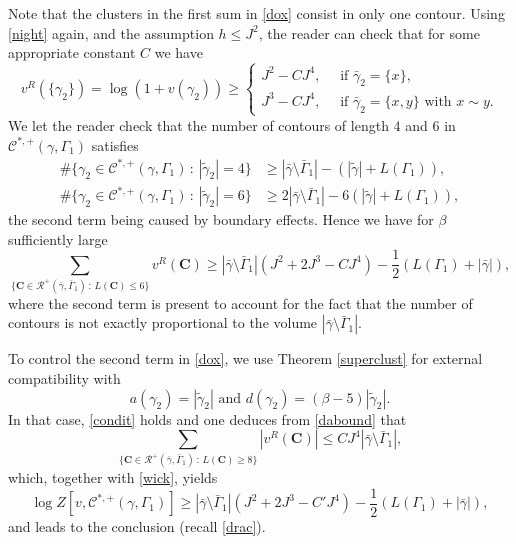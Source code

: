 \documentclass[JEP,XML,SOM,Unicode, NoFloatCountersInSection]{cedram}
\let\mathcal\mathscr
\newcommand{\sep}{\,:\,}
\numberwithin{equation}{section}
\theoremstyle{plain}
\theoremstyle{definition}
\newcommand{\cC}{{\ensuremath{\mathcal C}} }
\newcommand{\cR}{{\ensuremath{\mathcal R}} }
\newcommand{\bC}{{\ensuremath{\mathbf C}} }
\newcommand{\gb}{\beta}
\newcommand{\gG}{\Gamma}
\begin{document}
Note that the clusters in the first sum in \eqref{dox} consist in only one contour. Using \eqref{night} again, and the assumption $h\le J^2$, the reader can check that for some appropriate constant $C$ we have
\begin{equation}\label{speel}
v^R(\{\gamma_2\})=\log\left(1+ v(\gamma_2)\right)\ge \begin{cases} J^2-C J^4, \quad \text{ if } \bar \gamma_2=\{x\},\\
J^3-C J^4, \quad \text{ if } \bar \gamma_2=\{x,y\} \text{ with } x\sim y.
\end{cases}
\end{equation}
We let the reader check that the number of contours of length $4$ and $6$ in $\cC^{*,+}(\gamma,\gG_1)$ satisfies
\begin{equation*}
\begin{split}
\#\{ \gamma_2\in \cC^{*,+}(\gamma,\gG_1) \sep |\tilde \gamma_2|=4\}&\ge |\bar \gamma\setminus\bar \gG_1|-(|\tilde \gamma|+L(\gG_1)),\\
\#\{ \gamma_2\in \cC^{*,+}(\gamma,\gG_1) \sep |\tilde \gamma_2|=6\}&\ge 2|\bar \gamma\setminus\bar \gG_1|-6(|\tilde \gamma|+L(\gG_1)),
\end{split}
\end{equation*}
the second term being caused by boundary effects.
Hence we have for $\gb$ sufficiently large
\begin{equation}\label{wick}
\sum_{\{ \bC\in \cR^+(\bar \gamma,\bar \gG_1) \sep L(\bC)\le 6\}} v^R(\bC)
\ge |\bar \gamma\setminus\bar \gG_1|(J^2+2J^3-CJ^4)- \frac{1}{2}(L(\gG_1)+|\bar \gamma|),
\end{equation}
where the second term is present to account for the fact that the number of contours is not exactly proportional to the volume $|\bar \gamma\setminus\bar \gG_1|$.

To control the second term in \eqref{dox}, we use Theorem \ref{superclust} for external compatibility with
\[
a(\gamma_2)=|\tilde \gamma_2| \text{ and } d(\gamma_2)=(\gb-5)|\tilde \gamma_2|.
\]
In that case, \eqref{condit} holds and one deduces from \eqref{dabound} that
\begin{equation*}
\sum_{\{ \bC\in \cR^+(\bar \gamma,\bar \gG_1) \sep L(\bC)\ge 8\}} \left|v^R(\bC)\right|\le CJ^4|\bar \gamma\setminus\bar \gG_1|,
\end{equation*}
which, together with \eqref{wick}, yields
\begin{equation*}
\log Z[v,\cC^{*,+}(\gamma,\gG_1)]\ge |\bar \gamma\setminus\bar \gG_1|(J^2+2J^3-C'J^4)- \frac{1}{2}(L(\gG_1)+|\bar \gamma|),
\end{equation*}
and leads to the conclusion (recall \eqref{drac}).
\end{document}
